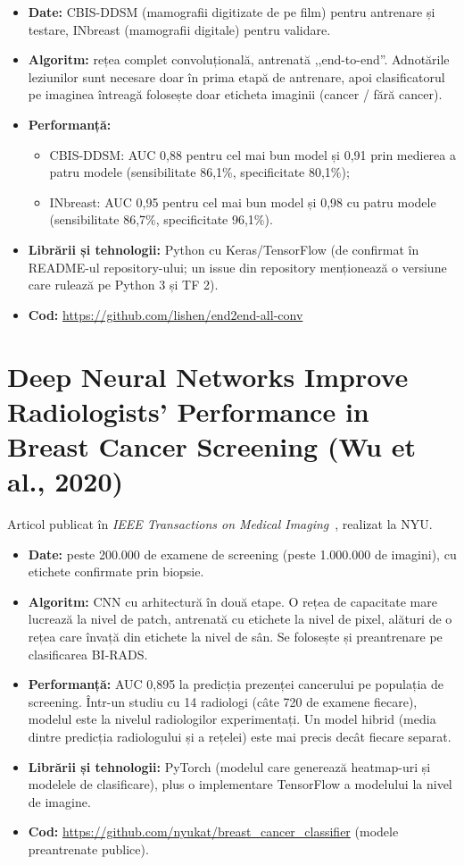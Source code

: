 \documentclass[runningheads,a4paper,11pt]{report}
\begin{document}
\begin{itemize}
	\item \textbf{Date:} CBIS-DDSM (mamografii digitizate de pe film) pentru antrenare și testare, INbreast (mamografii digitale) pentru validare.
	\item \textbf{Algoritm:} rețea complet convoluțională, antrenată ,,end-to-end''. Adnotările leziunilor sunt necesare doar în prima etapă de antrenare, apoi clasificatorul pe imaginea întreagă folosește doar eticheta imaginii (cancer / fără cancer).
	\item \textbf{Performanță:}
	\begin{itemize}
		\item CBIS-DDSM: AUC 0,88 pentru cel mai bun model și 0,91 prin medierea a patru modele (sensibilitate 86,1\%, specificitate 80,1\%);
		\item INbreast: AUC 0,95 pentru cel mai bun model și 0,98 cu patru modele (sensibilitate 86,7\%, specificitate 96,1\%).
	\end{itemize}
	\item \textbf{Librării și tehnologii:} Python cu Keras/TensorFlow (de confirmat în README-ul repository-ului; un issue din repository menționează o versiune care rulează pe Python 3 și TF 2).
	\item \textbf{Cod:} \url{https://github.com/lishen/end2end-all-conv}
\end{itemize}

\section{Deep Neural Networks Improve Radiologists' Performance in Breast Cancer Screening (Wu et al., 2020)}
\label{section:wu}

Articol publicat în \emph{IEEE Transactions on Medical Imaging}~\cite{wu2020}, realizat la NYU.

\begin{itemize}
	\item \textbf{Date:} peste 200.000 de examene de screening (peste 1.000.000 de imagini), cu etichete confirmate prin biopsie.
	\item \textbf{Algoritm:} CNN cu arhitectură în două etape. O rețea de capacitate mare lucrează la nivel de patch, antrenată cu etichete la nivel de pixel, alături de o rețea care învață din etichete la nivel de sân. Se folosește și preantrenare pe clasificarea BI-RADS.
	\item \textbf{Performanță:} AUC 0,895 la predicția prezenței cancerului pe populația de screening. Într-un studiu cu 14 radiologi (câte 720 de examene fiecare), modelul este la nivelul radiologilor experimentați. Un model hibrid (media dintre predicția radiologului și a rețelei) este mai precis decât fiecare separat.
	\item \textbf{Librării și tehnologii:} PyTorch (modelul care generează heatmap-uri și modelele de clasificare), plus o implementare TensorFlow a modelului la nivel de imagine.
	\item \textbf{Cod:} \url{https://github.com/nyukat/breast_cancer_classifier} (modele preantrenate publice).
\end{itemize}
\end{document}
